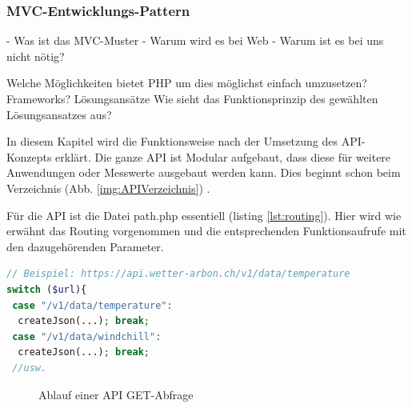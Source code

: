 \subsubsection{MVC-Entwicklungs-Pattern}
- Was ist das MVC-Muster
- Warum wird es bei Web
- Warum ist es bei uns nicht nötig?


Welche Möglichkeiten bietet PHP um dies möglichst einfach umzusetzen? Frameworks? Lösungsansätze
Wie sieht das Funktionsprinzip des gewählten Lösungsansatzes aus?




In diesem Kapitel wird die Funktionsweise nach der Umsetzung des API-Konzepts erklärt. Die ganze API ist Modular aufgebaut, dass diese für weitere Anwendungen oder Messwerte ausgebaut werden kann. Dies beginnt schon beim Verzeichnis (Abb. \ref{img:APIVerzeichnis}) .

Für die API ist die Datei path.php essentiell (listing \ref{lst:routing}). Hier wird wie erwähnt das Routing vorgenommen und die entsprechenden Funktionsaufrufe mit den dazugehörenden Parameter.

\vspace{3mm}
\begin{lstlisting}[label=lst:routing,caption=Routing der URL auf die richtige DB-Abfrage, language=php, style=php]
// Beispiel: https://api.wetter-arbon.ch/v1/data/temperature
switch ($url){
 case "/v1/data/temperature":
  createJson(...); break;
 case "/v1/data/windchill":
  createJson(...); break;
 //usw.
\end{lstlisting}
\vspace{3mm}

\begin{figure}[h!]
	\centering
	\caption{Ablauf einer API GET-Abfrage}
	\label{img:APIFiles}
\end{figure}



